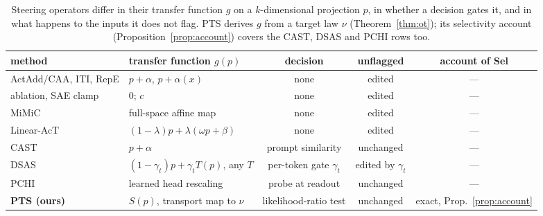 \begin{table}[t]\footnotesize\setlength{\tabcolsep}{3.5pt}
\centering
\begin{tabular}{l|l|c|c|c}
\hline
method & transfer function $g(p)$ & decision & unflagged & account of Sel \\
\hline
ActAdd/CAA, ITI, RepE & $p+\alpha$, $p+\alpha(x)$ & none & edited & --- \\
ablation, SAE clamp & $0$; $c$ & none & edited & --- \\
MiMiC & full-space affine map & none & edited & --- \\
Linear-AcT & $(1{-}\lambda)p+\lambda(\omega p+\beta)$ & none & edited & --- \\
CAST & $p+\alpha$ & prompt similarity & unchanged & --- \\
DSAS & $(1{-}\gamma_t)p+\gamma_t T(p)$, any $T$ & per-token gate $\gamma_t$ & edited by $\gamma_t$ & --- \\
PCHI & learned head rescaling & probe at readout & unchanged & --- \\
\hline
\textbf{PTS (ours)} & $S(p)$, transport map to $\nu$ & likelihood-ratio test & unchanged & exact, Prop.~\ref{prop:account} \\
\hline
\end{tabular}
\caption{Steering operators differ in their transfer function $g$ on a
$k$-dimensional projection $p$, in whether a decision gates it, and in what
happens to the inputs it does not flag. PTS derives $g$ from a target law
$\nu$ (Theorem~\ref{thm:ot}); its selectivity account
(Proposition~\ref{prop:account}) covers the CAST, DSAS and PCHI rows too.}
\label{tab:family}
\end{table}

